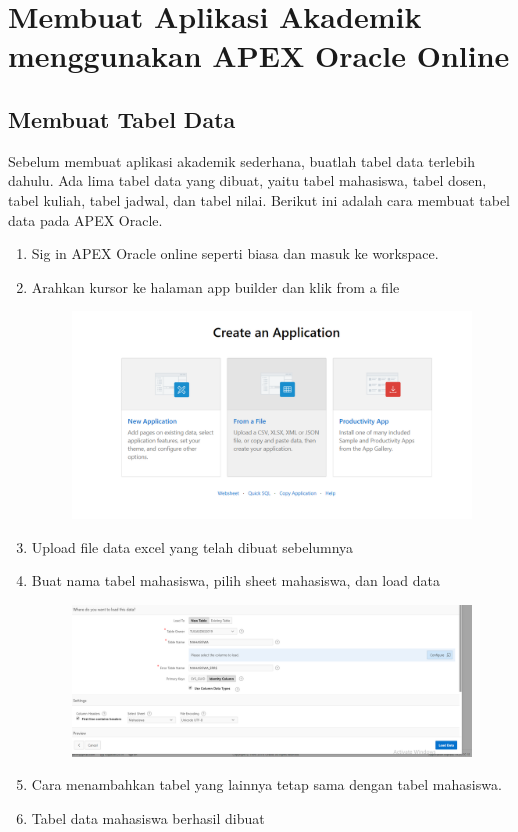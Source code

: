 \chapter{Membuat Aplikasi Akademik menggunakan APEX Oracle Online}

\section{Membuat Tabel Data}
Sebelum membuat aplikasi akademik sederhana, buatlah tabel data terlebih dahulu. Ada lima tabel data yang dibuat, yaitu tabel mahasiswa, tabel dosen, tabel kuliah, tabel jadwal, dan tabel nilai. Berikut ini adalah cara membuat tabel data pada APEX Oracle.
\begin{enumerate}
    \item Sig in APEX Oracle online seperti biasa dan masuk ke workspace.
    \item Arahkan kursor ke halaman app builder dan klik from a file
    
\begin{figure}[!htbp]
    \centering
    \includegraphics[scale=0.5]{figure/from.png}
    \label{penanda}
\end{figure}  
    
    \item Upload file data excel yang telah dibuat sebelumnya
    \item Buat nama tabel mahasiswa, pilih sheet mahasiswa, dan load data
    
\begin{figure}[!htbp]
    \centering
    \includegraphics[scale=0.35]{figure/tmhs.png}
    \label{penanda}
\end{figure}  
    
    \item Cara menambahkan tabel yang lainnya tetap sama dengan tabel mahasiswa.
    \item Tabel data mahasiswa berhasil dibuat
\end{enumerate}

